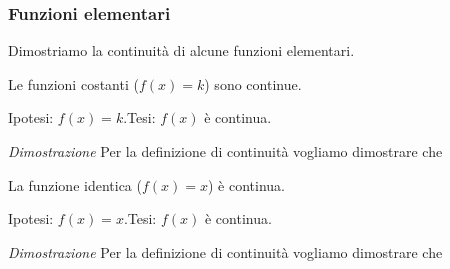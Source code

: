 \subsubsection{Funzioni elementari}
\label{subsubsec:cont_funzionielementari}

Dimostriamo la continuità di alcune funzioni elementari.

\begin{teorema}
Le funzioni costanti (\(f(x) = k\)) sono continue.
\end{teorema}

Ipotesi: \(f(x)=k\).\tab Tesi: \(f(x)\) è continua.


\noindent \emph{Dimostrazione}
Per la definizione di continuità vogliamo dimostrare che 


\begin{teorema}
La funzione identica (\(f(x) = x\)) è continua.
\end{teorema}

\noindent Ipotesi: \(f(x)=x\).\tab Tesi: \(f(x)\) è continua.

\emph{Dimostrazione}
Per la definizione di continuità vogliamo dimostrare che 


\newcommand{\overbow}[1]{
   \tikz [baseline = (N.base), every node/.style={}] {
      \node [inner sep = 0pt] (N) {$#1$};
      \draw [line width = 0.4pt] plot [smooth, tension=1.3] coordinates {
         ($(N.north west) + (0.1ex,0)$)
         ($(N.north)      + (0,0.5ex)$)
         ($(N.north east) + (0,0)$)
      };
   }
}

